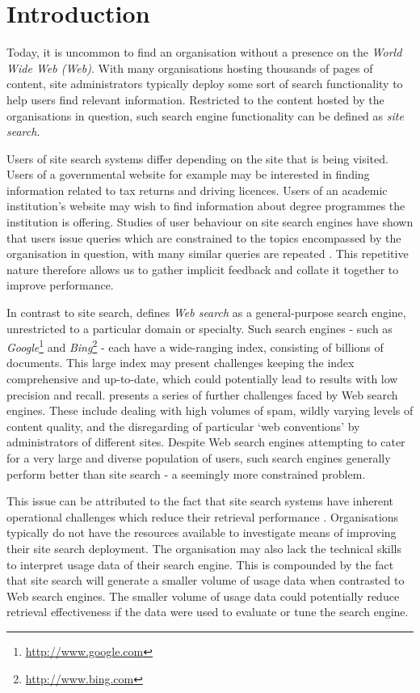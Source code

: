\section{Introduction}\label{sec_introduction}
Today, it is uncommon to find an organisation without a presence on the \emph{World Wide Web (Web)}. With many organisations hosting thousands of pages of content, site administrators typically deploy some sort of search functionality to help users find relevant information. Restricted to the content hosted by the organisations in question, such search engine functionality can be defined as \emph{site search}.

Users of site search systems differ depending on the site that is being visited. Users of a governmental website for example may be interested in finding information related to tax returns and driving licences. Users of an academic institution's website may wish to find information about degree programmes the institution is offering. Studies of user behaviour on site search engines have shown that users issue queries which are constrained to the topics encompassed by the organisation in question, with many similar queries are repeated \cite{chau2005site_log_analysis}. This repetitive nature therefore allows us to gather implicit feedback and collate it together to improve performance.

In contrast to site search, \citeauthor{chau2005site_log_analysis} \cite{chau2005site_log_analysis} defines \emph{Web search} as a general-purpose search engine, unrestricted to a particular domain or specialty. Such search engines - such as \emph{Google}\footnote{\url{http://www.google.com}} and \emph{Bing}\footnote{\url{http://www.bing.com}} - each have a wide-ranging index, consisting of billions of documents. This large index may present challenges keeping the index comprehensive and up-to-date, which could potentially lead to results with low precision and recall. \citeauthor{henzinger2002challenges_in_web_search} \cite{henzinger2002challenges_in_web_search} presents a series of further challenges faced by Web search engines. These include dealing with high volumes of spam, wildly varying levels of content quality, and the disregarding of particular `web conventions' by administrators of different sites. Despite Web search engines attempting to cater for a very large and diverse population of users, such search engines generally perform better than site search - a seemingly more constrained problem.

This issue can be attributed to the fact that site search systems have inherent operational challenges which reduce their retrieval performance \cite{ding2007log_based_site_search}. Organisations typically do not have the resources available to investigate means of improving their site search deployment. The organisation may also lack the technical skills to interpret usage data of their search engine. This is compounded by the fact that site search will generate a smaller volume of usage data when contrasted to Web search engines. The smaller volume of usage data could potentially reduce retrieval effectiveness if the data were used to evaluate or tune the search engine.

